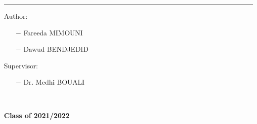 \begin{titlepage}
  \begin{center}
    \color{brown}\rule{0.7\textwidth}{2pt}
  \end{center}
  \vspace{1cm}
  \begin{center}
    \begin{minipage}[t]{0.4\textwidth}
      \begin{flushleft}
        {Author:}\\
        \begin{itemize}
          \item [$-$] {Fareeda \uppercase{Mimouni}}
          \item [$-$] {Dawud \uppercase{Bendjedid}}
        \end{itemize}
      \end{flushleft}
    \end{minipage}
    \begin{minipage}[t]{0.4\textwidth}
      \begin{flushleft}
        {Supervisor:} \\
        \begin{itemize}
          \item [$-$] {Dr. Medhi \uppercase{Bouali}}
        \end{itemize}
      \end{flushleft}

    \end{minipage}\\[2cm]
  \end{center}
  \begin{center}
    \textbf{{Class of 2021/2022}}
  \end{center}
\end{titlepage}
\newpage
